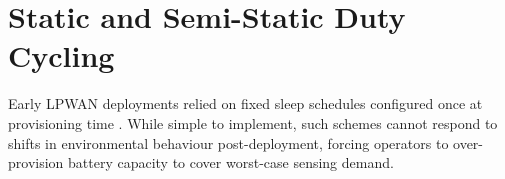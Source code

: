 \section{Static and Semi-Static Duty Cycling}
Early LPWAN deployments relied on fixed sleep schedules configured once at provisioning
time \cite{bor2016lora}. While simple to implement, such schemes cannot respond to shifts in
environmental behaviour post-deployment, forcing operators to over-provision battery capacity
to cover worst-case sensing demand.
